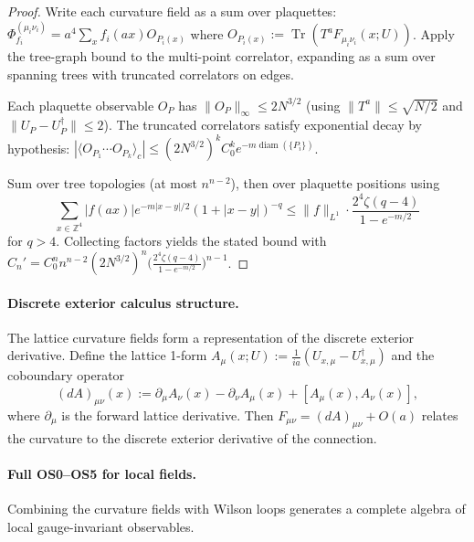 \documentclass[11pt]{amsart}
\begin{document}
\begin{proof}
Write each curvature field as a sum over plaquettes: $\Phi_{f_i}^{(\mu_i\nu_i)} = a^4 \sum_{x} f_i(ax) O_{P_i(x)}$ where $O_{P_i(x)} := \operatorname{Tr}(T^a F_{\mu_i\nu_i}(x;U))$. Apply the tree-graph bound to the multi-point correlator, expanding as a sum over spanning trees with truncated correlators on edges.

Each plaquette observable $O_P$ has $\|O_P\|_\infty \le 2N^{3/2}$ (using $\|T^a\| \le \sqrt{N/2}$ and $\|U_P - U_P^\dagger\| \le 2$). The truncated correlators satisfy exponential decay by hypothesis: $|\langle O_{P_1} \cdots O_{P_k} \rangle_c| \le (2N^{3/2})^k C_0^k e^{-m \operatorname{diam}(\{P_i\})}$.

Sum over tree topologies (at most $n^{n-2}$), then over plaquette positions using
\[
  \sum_{x\in\mathbb{Z}^4} |f(ax)| e^{-m|x-y|/2} (1+|x-y|)^{-q} \le \|f\|_{L^1} \cdot \frac{2^4 \zeta(q-4)}{1-e^{-m/2}}
\]
for $q > 4$. Collecting factors yields the stated bound with $C_n' = C_0^n n^{n-2} (2N^{3/2})^n \bigl(\frac{2^4 \zeta(q-4)}{1-e^{-m/2}}\bigr)^{n-1}$.
\end{proof}

\paragraph{Discrete exterior calculus structure.}
The lattice curvature fields form a representation of the discrete exterior derivative. Define the lattice 1-form $A_\mu(x;U) := \frac{1}{ia}(U_{x,\mu} - U_{x,\mu}^\dagger)$ and the coboundary operator
\[
  (dA)_{\mu\nu}(x) := \partial_\mu A_\nu(x) - \partial_\nu A_\mu(x) + [A_\mu(x), A_\nu(x)],
\]
where $\partial_\mu$ is the forward lattice derivative. Then $F_{\mu\nu} = (dA)_{\mu\nu} + O(a)$ relates the curvature to the discrete exterior derivative of the connection.

\paragraph{Full OS0--OS5 for local fields.}
Combining the curvature fields with Wilson loops generates a complete algebra of local gauge-invariant observables.
\end{document}
